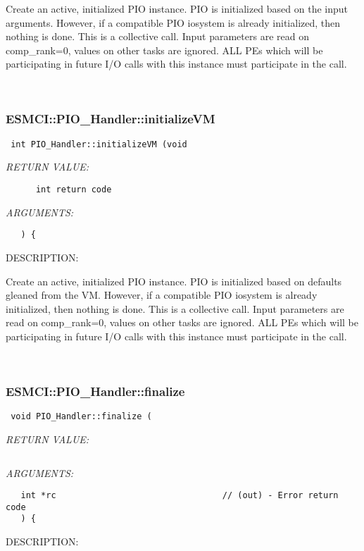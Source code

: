       Create an active, initialized PIO instance.
      PIO is initialized based on the input arguments. However, if a
      compatible PIO iosystem is already initialized, then nothing is done.
      This is a collective call. Input parameters are read on comp_rank=0,
      values on other tasks are ignored. ALL PEs which will be participating
      in future I/O calls with this instance must participate in the call.
   
 
\mbox{}\hrulefill\
 
\subsubsection [ESMCI::PIO\_Handler::initializeVM] {ESMCI::PIO\_Handler::initializeVM}


  
\begin{verbatim} int PIO_Handler::initializeVM (void\end{verbatim}{\em RETURN VALUE:}
\begin{verbatim}      int return code\end{verbatim}{\em ARGUMENTS:}
\begin{verbatim}   ) {\end{verbatim}
{\sf DESCRIPTION:\\ }


      Create an active, initialized PIO instance.
      PIO is initialized based on defaults gleaned from the VM. However, if a
      compatible PIO iosystem is already initialized, then nothing is done.
      This is a collective call. Input parameters are read on comp_rank=0,
      values on other tasks are ignored. ALL PEs which will be participating
      in future I/O calls with this instance must participate in the call.
   
 
\mbox{}\hrulefill\
 
\subsubsection [ESMCI::PIO\_Handler::finalize] {ESMCI::PIO\_Handler::finalize}


  
\begin{verbatim} void PIO_Handler::finalize (\end{verbatim}{\em RETURN VALUE:}
\begin{verbatim}      \end{verbatim}{\em ARGUMENTS:}
\begin{verbatim}   int *rc                                 // (out) - Error return code
   ) {\end{verbatim}
{\sf DESCRIPTION:\\ }


